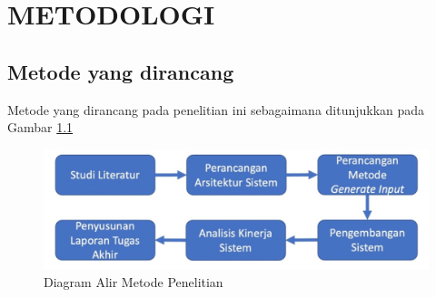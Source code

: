 \chapter{METODOLOGI}
\label{chap:metodologi}

\section{Metode yang dirancang}
\label{sec:metode yang dirancang}

Metode yang dirancang pada penelitian ini sebagaimana ditunjukkan pada Gambar \ref{fig:metode}

\begin{figure}[H]
  \centering
  \includegraphics[scale=0.4]{gambar/DiagramAlirMetodePenelitian.jpg}

  \caption{Diagram Alir Metode Penelitian}
  \label{fig:metode}
\end{figure}

